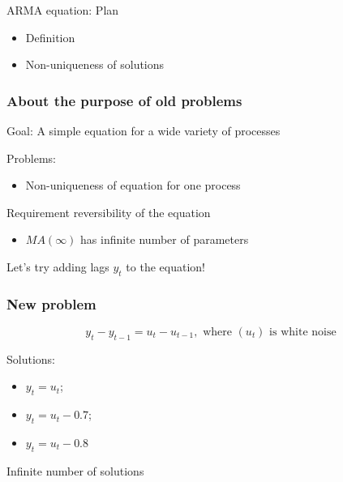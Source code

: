 
\begin{frame} %
	
	
\end{frame}



\begin{frame}{ARMA equation: Plan}
	\begin{itemize}[<+->]
		\item Definition
		\item Non-uniqueness of solutions
	\end{itemize}
		
\end{frame}

\begin{frame}
	\frametitle{About the purpose of old problems}
	
	Goal: A simple equation for a wide variety of processes
	
	\pause
	
	Problems:
	\begin{itemize}
		\item \alert{Non-uniqueness of equation} for one process
	\end{itemize}
	\pause
	
	Requirement \alert{reversibility of the equation} \pause
	\begin{itemize}
		\item $MA(\infty)$ has \alert{infinite} number of parameters
	\end{itemize}
	
	\pause
	Let's try \alert{adding lags} $y_t$ to the equation!
	
	
\end{frame}


\begin{frame}
	\frametitle{New problem}
	
	\[
	y_t - y_{t-1} = u_t - u_{t-1}, \text{ where } (u_t) \text{ is white noise}
	\]
	
	\pause
	Solutions:
	\pause
	\begin{itemize}[<+->]
		\item $y_t = u_t$;
		\item $y_t = u_t - 0.7$;
		\item $y_t = u_t - 0.8$
	\end{itemize}
	
	\pause
	
	\alert{Infinite} number of solutions
	
\end{frame}


